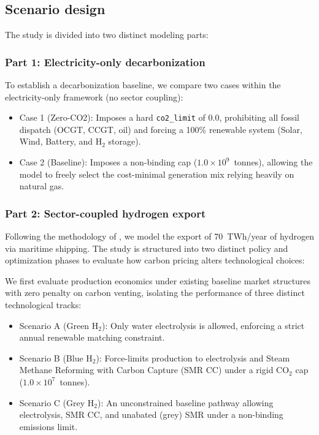 \documentclass[preprint,12pt]{elsarticle}
\begin{document}
\subsection{Scenario design}
The study is divided into two distinct modeling parts:

\subsubsection{Part 1: Electricity-only decarbonization}
To establish a decarbonization baseline, we compare two cases within the electricity-only framework (no sector coupling):
\begin{itemize}
    \item {Case 1 (Zero-CO2):} Imposes a hard \texttt{co2\_limit} of 0.0, prohibiting all fossil dispatch (OCGT, CCGT, oil) and forcing a 100\% renewable system (Solar, Wind, Battery, and $\text{H}_2$ storage).
    \item {Case 2 (Baseline):} Imposes a non-binding cap ($1.0 \times 10^9$~tonnes), allowing the model to freely select the cost-minimal generation mix relying heavily on natural gas.
\end{itemize}

\subsubsection{Part 2: Sector-coupled hydrogen export}
Following the methodology of \cite{abdelkhalek2025pypsa}, we model the export of 70~TWh/year of hydrogen via maritime shipping. The study is structured into two distinct policy and optimization phases to evaluate how carbon pricing alters technological choices:

We first evaluate production economics under existing baseline market structures with zero penalty on carbon venting, isolating the performance of three distinct technological tracks:
\begin{itemize}
    \item {Scenario A (Green H$_2$):} Only water electrolysis is allowed, enforcing a strict annual renewable matching constraint.
    \item {Scenario B (Blue H$_2$):} Force-limits production to electrolysis and Steam Methane Reforming with Carbon Capture (SMR CC) under a rigid $\text{CO}_2$ cap ($1.0 \times 10^7$~tonnes).
    \item {Scenario C (Grey H$_2$):} An unconstrained baseline pathway allowing electrolysis, SMR CC, and unabated (grey) SMR under a non-binding emissions limit.
\end{itemize}
\end{document}
